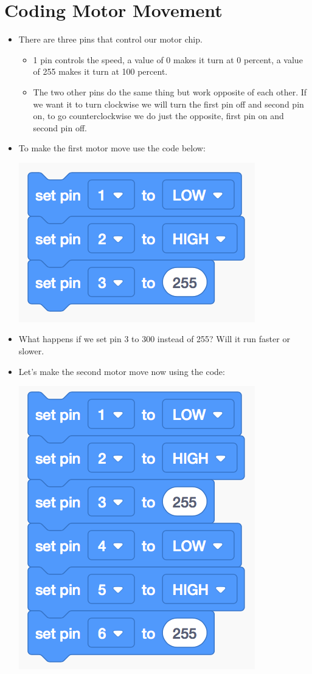 \documentclass[12pt]{article}
\begin{document}
 
\section *{Coding Motor Movement}
	\begin{itemize}
		\item There are three pins that control our motor chip. 
		\begin{itemize}
			\item 1 pin controls the speed, a value of 0 makes it turn at 0 percent, a value of 255 makes it turn at 100 percent.
			\item The two other pins do the same thing but work opposite of each other.  If we want it to turn clockwise we will turn the first pin off and second pin on, to go counterclockwise we do just the opposite, first pin on and second pin off.
		\end{itemize}
		\item To make the first motor move use the code below:
		\begin{center}
			\includegraphics[scale = 0.7]{./Images/code1}
		\end{center}
		\item What happens if we set pin 3 to 300 instead of 255?  Will it run faster or slower.
		\item Let's make the second motor move now using the code:
		\begin{center}
			\includegraphics[scale = 0.7]{./Images/code2}

\end{center}
\end{itemize}
\end{document}
